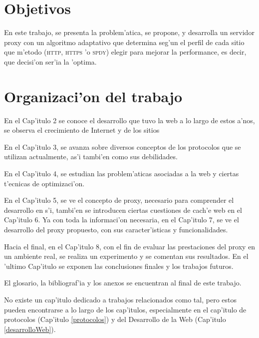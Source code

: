 \section{Objetivos}

En este trabajo, se presenta la problem'atica, se propone, y desarrolla un servidor proxy con un algoritmo adaptativo que determina seg'un el perfil de cada sitio que m'etodo (\textsc{http}, \textsc{https} 'o \textsc{spdy}) elegir para mejorar la performance, es decir, que decisi'on ser'ia la 'optima.

\section{Organizaci'on del trabajo}

En el Cap'itulo 2 se conoce el desarrollo que tuvo la web a lo largo de estos a'nos, se observa el crecimiento  de Internet y de los sitios

En el Cap'itulo 3, se avanza sobre diversos conceptos de los protocolos que se utilizan actualmente, as'i tambi'en como sus debilidades. 

En el Cap'itulo 4, se estudian las problem'aticas asociadas a la web y ciertas t'ecnicas de optimizaci'on. 

En el Cap'itulo 5, se ve el concepto de proxy, necesario para comprender el desarrollo en s'i, tambi'en se introducen ciertas cuestiones de cach'e web en el Cap'itulo 6. Ya con toda la informaci'on necesaria, en el Cap'itulo 7, se ve el desarrollo del proxy propuesto, con sus caracter'isticas y funcionalidades. 

Hacia el final, en el Cap'itulo 8, con el fin de evaluar las prestaciones del proxy en un ambiente real, se realiza un experimento y se comentan sus resultados. En el 'ultimo Cap'itulo se exponen las conclusiones finales y los trabajos futuros.

El glosario, la bibliograf'ia y los anexos se encuentran al final de este trabajo. 

No existe un cap'itulo dedicado a trabajos relacionados como tal, pero estos pueden encontrarse a lo largo de los cap'itulos, especialmente en el cap'itulo de protocolos (Cap'itulo \ref{protocolos}) y del Desarrollo de la Web (Cap'itulo \ref{desarrolloWeb}).